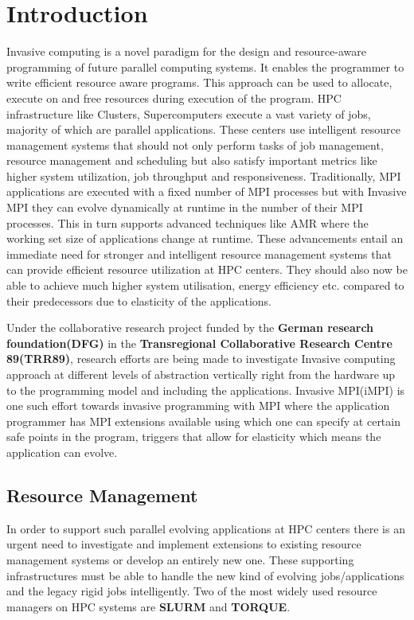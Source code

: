 \documentclass{acm_proc_article-sp}
\begin{document}
\section{Introduction}
Invasive computing is a novel paradigm for the design and resource-aware programming of future parallel computing systems. It enables the programmer to write efficient resource aware programs. This approach can be used to allocate, execute on and free resources during execution of the program. HPC infrastructure like Clusters, Supercomputers execute a vast variety of jobs, majority of which are parallel applications. These centers use intelligent resource management systems that should not only perform tasks of job management, resource management and scheduling but also satisfy important metrics like higher system utilization, job throughput and responsiveness. Traditionally, MPI applications are executed with a fixed number of MPI processes but with Invasive MPI they can evolve dynamically at runtime in the number of their MPI processes. This in turn supports advanced techniques like AMR where the working set size of applications change at runtime. These advancements entail an immediate need for stronger and intelligent resource management systems that can provide efficient resource utilization at HPC centers. They should also now be able to achieve much higher system utilisation, energy efficiency etc. compared to their predecessors due to elasticity of the applications.\par
\noindent
Under the collaborative research project funded by the \textbf{German research foundation(DFG)} in the \textbf{Transregional Collaborative Research Centre 89(TRR89)}, research efforts are being made to investigate Invasive computing approach at different levels of abstraction vertically right from the hardware up to the programming model and including the applications. Invasive MPI(iMPI) is one such effort towards invasive programming with MPI where the application programmer has MPI extensions available using which one can specify at certain safe points in the program, triggers that allow for elasticity which means the application can evolve.

\subsection{Resource Management}
In order to support such parallel evolving applications at HPC centers there is an urgent need to investigate and implement extensions to existing resource management systems or develop an entirely new one. These supporting infrastructures must be able to handle the new kind of evolving jobs/applications and the legacy rigid jobs intelligently. Two of the most widely used resource managers on HPC systems are \textbf{SLURM} and \textbf{TORQUE}. 
\end{document}
